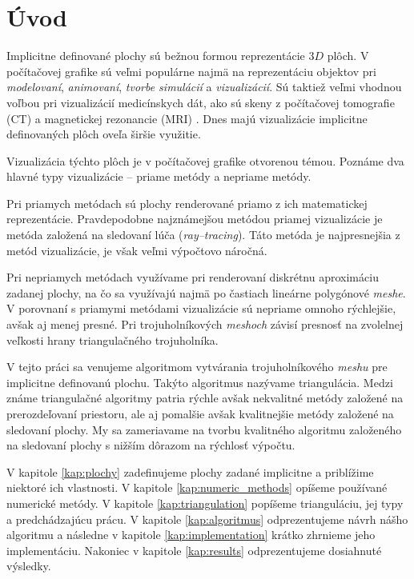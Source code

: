 \chapter*{Úvod} %

Implicitne definované plochy sú bežnou formou reprezentácie $3D$ plôch. V počítačovej grafike 
sú veľmi populárne najmä na reprezentáciu objektov pri \textit{modelovaní}, \textit{animovaní}, 
\textit{tvorbe simulácií} a \textit{vizualizácií}. Sú taktiež veľmi vhodnou
voľbou pri vizualizácií medicínskych dát, ako sú skeny z počítačovej tomografie (CT) a magnetickej
rezonancie (MRI) \cite{de2015survey}.
Dnes majú vizualizácie implicitne definovaných plôch oveľa širšie využitie.

Vizualizácia týchto plôch je v počítačovej grafike otvorenou témou. Poznáme 
dva hlavné typy vizualizácie -- priame metódy a nepriame metódy. 

Pri priamych metódach sú plochy renderované priamo z ich 
matematickej reprezentácie. Pravdepodobne najznámejšou metódou priamej vizualizácie je 
metóda založená na sledovaní lúča (\textit{ray--tracing}). Táto metóda je najpresnejšia z metód vizualizácie,
je však veľmi výpočtovo náročná.

Pri nepriamych metódach využívame pri renderovaní diskrétnu aproximáciu zadanej plochy, 
na čo sa využívajú najmä po častiach lineárne polygónové \textit{meshe}. 
V porovnaní s priamymi metódami 
vizualizácie sú nepriame omnoho rýchlejšie, avšak aj menej presné. Pri trojuholníkových 
\textit{meshoch} závisí presnosť na zvolelnej veľkosti hrany triangulačného trojuholníka. 

V tejto práci sa venujeme algoritmom vytvárania trojuholníkového \textit{meshu} pre 
implicitne definovanú plochu. Takýto algoritmus nazývame triangulácia. Medzi známe triangulačné 
algoritmy patria rýchle avšak nekvalitné metódy založené na prerozdeľovaní priestoru, 
ale aj pomalšie avšak kvalitnejšie metódy založené na sledovaní plochy.
My sa zameriavame na tvorbu kvalitného algoritmu založeného na sledovaní plochy
s nižším dôrazom na rýchlosť výpočtu.

V kapitole \ref{kap:plochy} zadefinujeme plochy zadané implicitne a priblížime niektoré ich vlastnosti.
V kapitole \ref{kap:numeric_methods} opíšeme používané numerické metódy.
V kapitole \ref{kap:triangulation} popíšeme trianguláciu, jej typy a predchádzajúcu prácu.
V kapitole \ref{kap:algoritmus} odprezentujeme návrh nášho algoritmu a následne v kapitole 
\ref{kap:implementation} krátko zhrnieme jeho implementáciu.
Nakoniec v kapitole \ref{kap:results} odprezentujeme dosiahnuté výsledky. 


